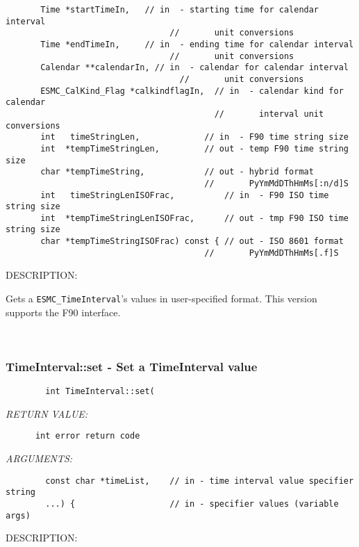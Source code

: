 \begin{verbatim}
       Time *startTimeIn,   // in  - starting time for calendar interval
                                 //       unit conversions
       Time *endTimeIn,     // in  - ending time for calendar interval
                                 //       unit conversions
       Calendar **calendarIn, // in  - calendar for calendar interval
                                   //       unit conversions
       ESMC_CalKind_Flag *calkindflagIn,  // in  - calendar kind for calendar
                                          //       interval unit conversions
       int   timeStringLen,             // in  - F90 time string size
       int  *tempTimeStringLen,         // out - temp F90 time string size
       char *tempTimeString,            // out - hybrid format
                                        //       PyYmMdDThHmMs[:n/d]S
       int   timeStringLenISOFrac,          // in  - F90 ISO time string size
       int  *tempTimeStringLenISOFrac,      // out - tmp F90 ISO time string size
       char *tempTimeStringISOFrac) const { // out - ISO 8601 format
                                        //       PyYmMdDThHmMs[.f]S\end{verbatim}
{\sf DESCRIPTION:\\ }


        Gets a {\tt ESMC\_TimeInterval}'s values in user-specified format.
        This version supports the F90 interface.
   
 
\mbox{}\hrulefill\ 
 
\subsubsection [TimeInterval::set] {TimeInterval::set - Set a TimeInterval value}


  
\begin{verbatim}        int TimeInterval::set(\end{verbatim}{\em RETURN VALUE:}
\begin{verbatim}      int error return code\end{verbatim}{\em ARGUMENTS:}
\begin{verbatim}        const char *timeList,    // in - time interval value specifier string
        ...) {                   // in - specifier values (variable args)\end{verbatim}
{\sf DESCRIPTION:\\ }


